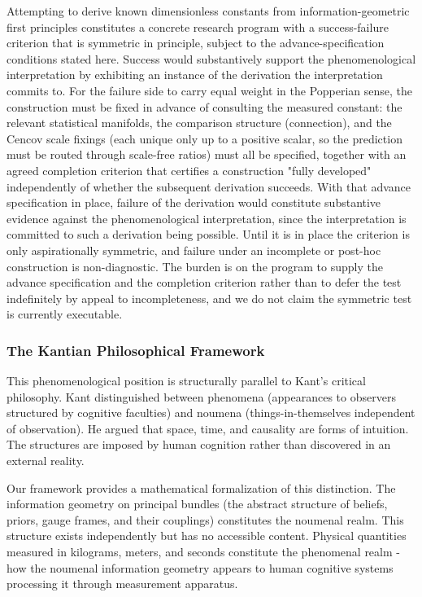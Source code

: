 \documentclass[11pt]{article}
\begin{document}
Attempting to derive known dimensionless constants from information-geometric first principles constitutes a concrete research program with a success-failure criterion that is symmetric in principle, subject to the advance-specification conditions stated here. Success would substantively support the phenomenological interpretation by exhibiting an instance of the derivation the interpretation commits to. For the failure side to carry equal weight in the Popperian sense, the construction must be fixed in advance of consulting the measured constant: the relevant statistical manifolds, the comparison structure (connection), and the Cencov scale fixings (each unique only up to a positive scalar, so the prediction must be routed through scale-free ratios) must all be specified, together with an agreed completion criterion that certifies a construction "fully developed" independently of whether the subsequent derivation succeeds. With that advance specification in place, failure of the derivation would constitute substantive evidence against the phenomenological interpretation, since the interpretation is committed to such a derivation being possible. Until it is in place the criterion is only aspirationally symmetric, and failure under an incomplete or post-hoc construction is non-diagnostic. The burden is on the program to supply the advance specification and the completion criterion rather than to defer the test indefinitely by appeal to incompleteness, and we do not claim the symmetric test is currently executable.

\subsubsection{The Kantian Philosophical Framework}

This phenomenological position is structurally parallel to Kant's critical philosophy. Kant distinguished between phenomena (appearances to observers structured by cognitive faculties) and noumena (things-in-themselves independent of observation). He argued that space, time, and causality are forms of intuition.  The structures are imposed by human cognition rather than discovered in an external reality.

Our framework provides a mathematical formalization of this distinction. The information geometry on principal bundles (the abstract structure of beliefs, priors, gauge frames, and their couplings) constitutes the noumenal realm. This structure exists independently but has no accessible content. Physical quantities measured in kilograms, meters, and seconds constitute the phenomenal realm - how the noumenal information geometry appears to human cognitive systems processing it through measurement apparatus.
\end{document}
